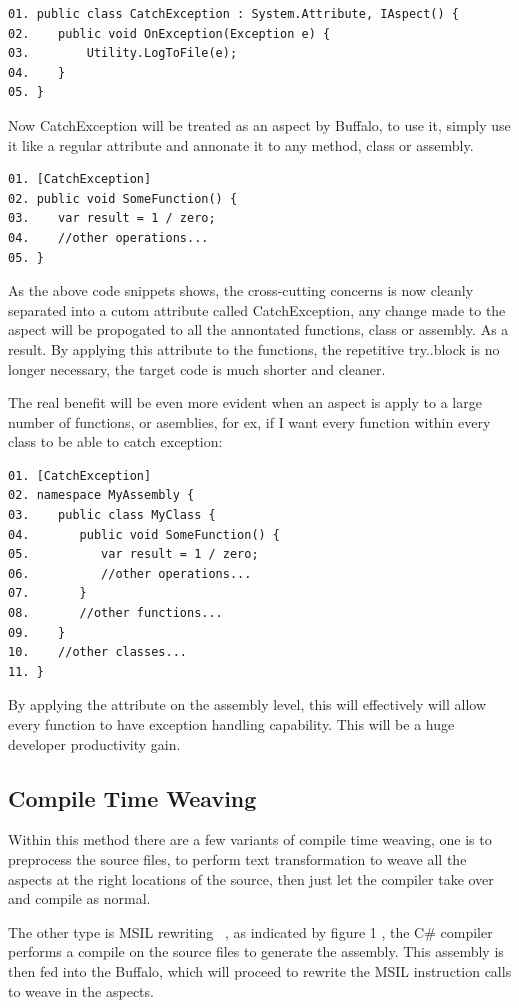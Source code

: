 \begin{verbatim}
01. public class CatchException : System.Attribute, IAspect() {
02.    public void OnException(Exception e) {
03.        Utility.LogToFile(e);
04.    } 
05. }
\end{verbatim}

Now CatchException will be treated as an aspect by Buffalo, to use it, simply use it like a regular attribute and annonate it to any method, class or assembly.

\begin{verbatim}
01. [CatchException]
02. public void SomeFunction() {
03.    var result = 1 / zero;
04.    //other operations...
05. }
\end{verbatim}

As the above code snippets shows, the cross-cutting concerns is now cleanly separated into a cutom attribute called CatchException, any change made to the aspect will be propogated to all the annontated functions, class or assembly. As a result. By applying this attribute to the functions, the repetitive try..block is no longer necessary, the target code is much shorter and cleaner. 

The real benefit will be even more evident when an aspect is apply to a large number of functions, or asemblies, for ex, if I want every function within every class to be able to catch exception:

\begin{verbatim}
01. [CatchException]
02. namespace MyAssembly {
03.    public class MyClass {
04.       public void SomeFunction() {
05.          var result = 1 / zero;
06.          //other operations...
07.       }
08.       //other functions...
09.    }
10.    //other classes...
11. }
\end{verbatim}

By applying the attribute on the assembly level, this will effectively will allow every function to have exception handling capability. This will be a huge developer productivity gain.


\subsection{Compile Time Weaving}
Within this method there are a few variants of compile time weaving, one is to preprocess the source files, to perform text transformation to weave all the aspects at the right locations of the source, then just let the compiler take over and compile as normal.

The other type is MSIL rewriting ~\cite{rewrite_msil}, as indicated by figure 1 , the C\# compiler performs a compile on the source files to generate the assembly. This assembly is then fed into the Buffalo, which will proceed to rewrite the MSIL instruction calls to weave in the aspects.

